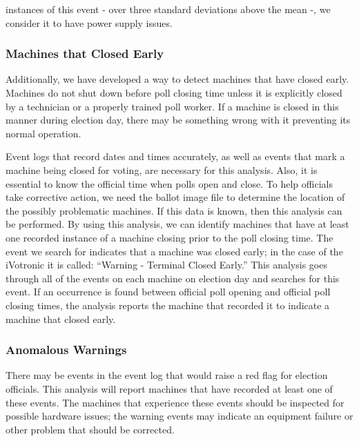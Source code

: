 instances of this event - over three standard deviations above the mean -, we consider it to have power supply issues.    

\subsubsection{Machines that Closed Early}
Additionally, we have developed a way to detect machines that have closed early. Machines do not shut down before poll closing time unless it is explicitly closed by a technician or a properly trained poll worker. If a machine is closed in this manner during election day, there may be something wrong with it preventing its normal operation.
                  
Event logs that record dates and times accurately, as well as events that mark a machine being closed for voting, are necessary for this analysis. Also, it is essential to know the official time when polls open and close. To help officials take corrective action, we need the ballot image file to determine the location of the possibly problematic machines.  If this data is known, then this analysis can be performed. By using this analysis, we can identify machines that have at least one recorded instance of a machine closing prior to the poll closing time. The event we search for indicates that a machine was closed early; in the case of the iVotronic it is called: \textquotedblleft Warning - Terminal Closed Early.\textquotedblright \hspace{2 mm} This analysis goes through all of the events on each machine on election day and searches for this event. If an occurrence is found between official poll opening and official poll closing times, the analysis reports the machine that recorded it to indicate a machine that closed early.  
        
\subsubsection{Anomalous Warnings}
There may be events in the event log that would raise a red flag for election officials. This analysis will report machines that have recorded at least one of these events. The machines that experience these events should be inspected for possible hardware issues; the warning events may indicate an equipment failure or other problem that should be corrected.

